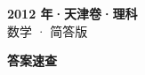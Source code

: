 \documentclass[zihao=-4, a4paper]{ctexart}
\begin{document}
\begin{center}
  {\Large\bfseries 2012 年·天津卷·理科}\\[4pt]
  {\large 数学 · 简答版}
\end{center}
\medskip
{}

\clearpage
{}
\begin{center}{\Large\bfseries 答案速查}\end{center}
\medskip

\end{document}
